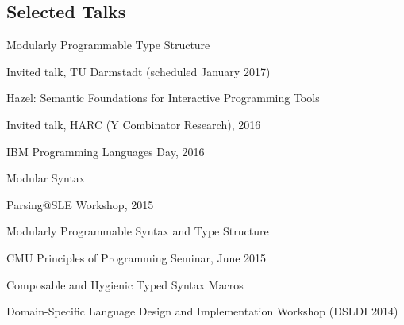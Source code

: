 \documentclass[10pt,letterpaper]{article}
\renewenvironment{itemize}{
  \begin{list}{}{
    \setlength{\leftmargin}{1.5em}
    \setlength{\itemsep}{0.25em}
    \setlength{\parskip}{0pt}
    \setlength{\parsep}{0.25em}
  }
}{
  \end{list}
}
\begin{document}
\subsection*{Selected Talks}
\begin{enumerate}
  \item Modularly Programmable Type Structure
    \begin{itemize}
      \item Invited talk, TU Darmstadt (scheduled January 2017)
    \end{itemize}
  \item Hazel: Semantic Foundations for Interactive Programming Tools
    \begin{itemize}
      \item Invited talk, HARC (Y Combinator Research), 2016
      \item IBM Programming Languages Day, 2016
    \end{itemize}
  \item Modular Syntax 
    \begin{itemize}
      \item Parsing@SLE Workshop, 2015
    \end{itemize}
  \item Modularly Programmable Syntax and Type Structure
    \begin{itemize}
      \item CMU Principles of Programming Seminar, June 2015
    \end{itemize}
  \item Composable and Hygienic Typed Syntax Macros
    \begin{itemize}
      \item {Domain-Specific Language Design and Implementation Workshop (DSLDI 2014)}
    \end{itemize}


\end{enumerate}
\end{document}
